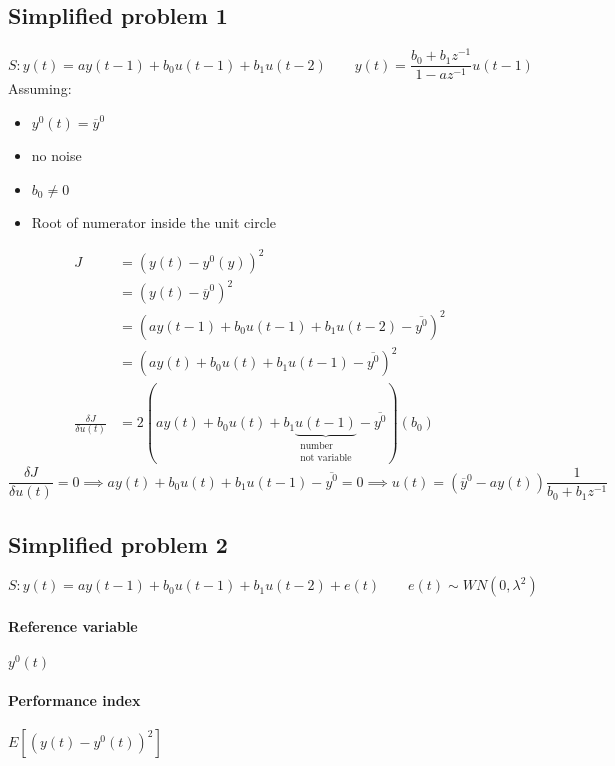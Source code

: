 \documentclass{report}
\begin{document}
\subsection{Simplified problem 1}
\[
S:y(t)=ay(t-1)+b_0u(t-1)+b_1u(t-2)
\qquad
y(t)=\frac{b_0+b_1z^{-1}}{1-az^{-1}}u(t-1)
\]
Assuming:
\begin{itemize}
\item $y^0(t)=\overline{y}^0$
\item no noise
\item $b_0\neq 0$
\item Root of numerator inside the unit circle
\end{itemize}
\begin{align*}
J&=\left(y(t)-y^0(y)\right)^2\\
&=\left(y(t)-\overline{y}^0\right)^2\\
&=\left(ay(t-1)+b_0u(t-1)+b_1u(t-2)-\overline{y^0}\right)^2\\
&=\left(ay(t)+b_0u(t)+b_1u(t-1)-\overline{y^0}\right)^2\\
\frac{\delta J}{\delta u(t)}&=2\left(ay(t)+b_0u(t)+b_1\underbrace{u(t-1)}_{\substack{\text{number}\\\text{not variable}}}-\overline{y^0}\right)(b_0)
\end{align*}
\[
\frac{\delta J}{\delta u(t)}=0
\implies
ay(t)+b_0u(t)+b_1u(t-1)-\overline{y^0}=0
\implies
u(t)=(\overline{y}^0-ay(t))\frac{1}{b_0+b_1z^{-1}}
\]
\subsection{Simplified problem 2}
\[
S:y(t)=ay(t-1)+b_0u(t-1)+b_1u(t-2)+e(t)
\qquad
e(t)\sim WN(0,\lambda^2)
\]
\paragraph{Reference variable} $y^0(t)$
\paragraph{Performance index} $E\left[(y(t)-y^0(t))^2\right]$
\end{document}
